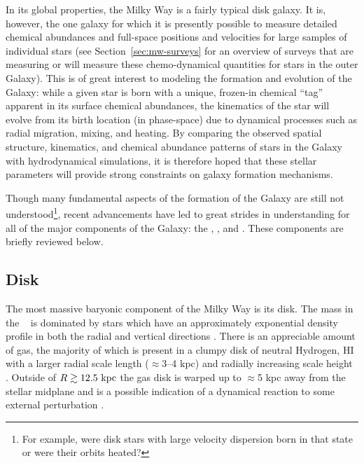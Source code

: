 In its global properties, the Milky Way is a fairly typical disk galaxy. It is,
however, the one galaxy for which it is presently possible to measure detailed
chemical abundances and full-space positions and velocities for large samples of
individual stars (see Section~\ref{sec:mw-surveys} for an overview of surveys
that are measuring or will measure these chemo-dynamical quantities for stars in
the outer Galaxy). This is of great interest to modeling the formation and
evolution of the Galaxy: while a given star is born with a unique, frozen-in
chemical ``tag'' apparent in its surface chemical abundances, the kinematics of
the star will evolve from its birth location (in phase-space) due to dynamical
processes such as radial migration, mixing, and heating. By comparing the
observed spatial structure, kinematics, and chemical abundance patterns of stars
in the Galaxy with hydrodynamical simulations, it is therefore hoped that these
stellar parameters will provide strong constraints on galaxy formation
mechanisms.

Though many fundamental aspects of the formation of the Galaxy are still not
understood\footnote{For example, were disk stars with large velocity dispersion
born in that state or were their orbits heated?}, recent advancements have led
to great strides in understanding for all of the major components of the Galaxy:
the \mwdisk, \mwbulge, and \mwhalo. These components are briefly reviewed below.

\subsection{Disk}

The most massive baryonic component of the Milky Way is its disk. The mass in
the \mwdisk\ \citep[$M_d \approx 5 \times 10^{10}~\msun$;][]{mcmillan11} is
dominated by stars which have an approximately exponential density profile in
both the radial and vertical directions \citep[with scale lengths of $\approx$2
--3 kpc and $\approx$250--800 pc, respectively, from thin to thick
disk;][]{ojha01, juric08, mcmillan11, bovy12-spatialMAP}. There is an
appreciable amount of gas, the majority of which is present in a clumpy disk of
neutral Hydrogen, HI \citep[$M_{\rm HI} \approx 8 \times
10^9~\msun$;][]{kalberla09} with a larger radial scale length ($\approx$3--4
kpc) and radially increasing scale height \citep[$\approx$100 pc at $R=8~\kpc$
to $\approx$1 kpc at $R=25~\kpc$;][]{wouterloot90, merrifield92}. Outside of $R
\gtrsim 12.5~\mathrm{kpc}$ the gas disk is warped up to $\approx$5 kpc away from the
stellar midplane \citep{henderson82, kalberla07} and is a possible indication of
a dynamical reaction to some external perturbation \citep[e.g.,][]{bekki12}.

